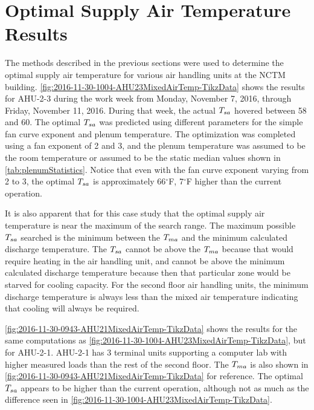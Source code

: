 \section{Optimal Supply Air Temperature Results}\label{sec:OptimalSupplyAirTemperatureResults}

The methods described in the previous sections were used to determine
the optimal supply air temperature for various air handling units at the
NCTM building.  \figref{}
\ref{fig:2016-11-30-1004-AHU23MixedAirTemp-TikzData} shows the results
for AHU-2-3 during the work week from Monday, November 7, 2016, through
Friday, November 11, 2016.  During that week, the actual \(T_{sa}\) hovered
between \SI{58}{\degreeF} and \SI{60}{\degreeF}. The optimal \(T_{sa}\) was predicted using
different parameters for the simple fan curve exponent and plenum
temperature.  The optimization was completed using a fan exponent of 2
and 3, and the plenum temperature was assumed to be the room temperature
or assumed to be the static median values shown in \tableref{}
\ref{tab:plenumStatistics}.  Notice that even with the fan curve
exponent varying from 2 to 3, the optimal \(T_{sa}\) is approximately
66\(^\circ\)F, 7\(^\circ\)F higher than the current operation. 

It is also apparent that for this case study that the optimal supply air
temperature is near the maximum of the search range.  The maximum
possible \(T_{sa}\) searched is the minimum between the \(T_{ma}\) and the
minimum calculated discharge temperature. The \(T_{sa}\) cannot be above
the \(T_{ma}\) because that would require heating in the air handling
unit, and cannot be above the minimum calculated discharge temperature
because then that particular zone would be starved for cooling capacity.
For the second floor air handling units, the minimum discharge
temperature is always less than the mixed air temperature indicating
that cooling will always be required.  

\figref{} \ref{fig:2016-11-30-0943-AHU21MixedAirTemp-TikzData} shows the
results for the same computations as \figref{}
\ref{fig:2016-11-30-1004-AHU23MixedAirTemp-TikzData}, but for AHU-2-1.
AHU-2-1 has 3 terminal units supporting a computer lab with higher
measured loads than the rest of the second floor.  The \(T_{ma}\) is also
shown in \figref{} \ref{fig:2016-11-30-0943-AHU21MixedAirTemp-TikzData}
for reference. The optimal \(T_{sa}\) appears to be higher than the
current operation, although not as much as the difference seen in
\figref{} \ref{fig:2016-11-30-1004-AHU23MixedAirTemp-TikzData}.


